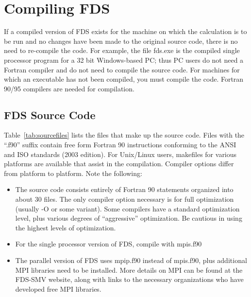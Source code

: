 \documentclass[11pt]{book}
\begin{document}
\chapter{Compiling FDS}
\label{info:compilation}

If a compiled version of FDS exists for the machine on which the
calculation is to be run and no changes have been made to
the original source code, there is no need to re-compile the code.
For example, the file {\ct fds.exe} is the
compiled single processor program for a 32 bit Windows-based PC;
thus PC users do not need a
Fortran compiler and do not need to compile the source code.
For machines for which an executable has not been compiled, you must
compile the code. Fortran 90/95 compilers are needed for compilation.

\section{FDS Source Code}

Table~\ref{tab:sourcefiles} lists the files that make up the source code.
Files with the ``.f90'' suffix contain free form Fortran 90 instructions
conforming to the ANSI and ISO standards (2003 edition).
For Unix/Linux users, {\ct makefiles} for various platforms are available
that assist in the compilation. Compiler options differ from platform to platform.
Note the following:
\begin{itemize}
\item The source code consists entirely of Fortran 90
statements organized into about 30 files.
The only compiler option necessary is for full optimization (usually -O or some variant). Some
compilers have a standard optimization level, plus various degrees of
``aggressive'' optimization. Be cautious in using the highest levels of optimization.
\item For the single processor version of FDS, compile with {\ct mpis.f90}
\item The parallel version of FDS uses {\ct mpip.f90} instead of
{\ct mpis.f90}, plus additional MPI libraries need to be installed. More
details on MPI can be found at the FDS-SMV website, along with links to the
necessary organizations who have developed free MPI libraries.
\end{itemize}
\end{document}
